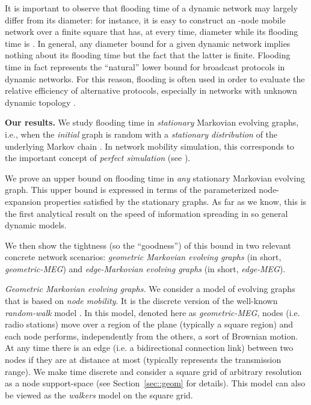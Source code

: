 \documentclass[10pt,a4paper]{article}
\begin{document}
\noindent It is important to observe that flooding time of a  dynamic network  may largely differ from its diameter: for instance, it is easy to construct  an -node mobile  network over a finite square that has, at every time, diameter  while its flooding time is . In general, any diameter bound for a given dynamic network implies nothing about its flooding time but the fact that the latter is finite. Flooding time in fact represents the ``natural'' lower bound for broadcast protocols in dynamic networks. For this reason, flooding is often used in order to evaluate the relative efficiency of alternative protocols, especially in networks with unknown dynamic topology \cite{CL05,GS05,OS07}.

\medskip \noindent \textbf{Our results.}
We study flooding time in \emph{stationary} Markovian evolving graphs, i.e., when the \emph{initial} graph is random with a \emph{stationary distribution} of the underlying Markov chain \cite{AF99}. In network mobility simulation, this corresponds to the important concept of \emph{perfect simulation} (see \cite{LV05,CNB04}).

We prove an upper bound on flooding time in \emph{any} stationary Markovian evolving graph. This upper bound is expressed in terms of the parameterized node-expansion properties satisfied by the stationary graphs. As far as we know, this is the first analytical result on the speed of information spreading in so general dynamic models.

\noindent We then show the tightness (so the ``goodness'') of this bound in two relevant concrete network scenarios: \emph{geometric Markovian evolving graphs} (in short, \emph{geometric-MEG}) and \emph{edge-Markovian evolving graphs} (in short, \emph{edge-MEG}).

\smallskip \noindent \emph{Geometric Markovian evolving graphs.}
We consider a model of evolving graphs that is based on \emph{node mobility}. It is the discrete version of the well-known \emph{random-walk} model \cite{G87,CBD02,DMP08,JMR09}. In this model, denoted here as \emph{geometric-MEG}, nodes (i.e. radio stations) move over a region of the plane (typically a square region) and each node performs, independently from the others, a sort of Brownian motion. At any time there is an edge (i.e. a bidirectional connection link) between two nodes if they are at distance at most  (typically  represents the transmission range). We make time discrete and consider a square grid of arbitrary resolution as a node support-space (see Section~\ref{sec::geom} for details). This model can also be viewed as the \emph{walkers} model \cite{DMP08} on the square grid.
\end{document}
